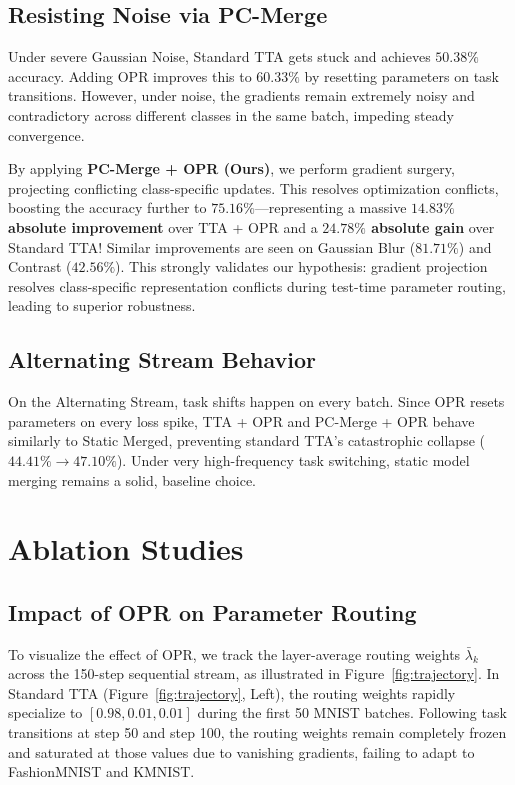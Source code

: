 \documentclass{article}
\theoremstyle{plain}
\theoremstyle{definition}
\theoremstyle{remark}
\begin{document}
\subsection{Resisting Noise via PC-Merge}
Under severe Gaussian Noise, Standard TTA gets stuck and achieves $50.38\%$ accuracy. Adding OPR improves this to $60.33\%$ by resetting parameters on task transitions. However, under noise, the gradients remain extremely noisy and contradictory across different classes in the same batch, impeding steady convergence.

By applying \textbf{PC-Merge + OPR (Ours)}, we perform gradient surgery, projecting conflicting class-specific updates. This resolves optimization conflicts, boosting the accuracy further to $\mathbf{75.16\%}$—representing a massive \textbf{$14.83\%$ absolute improvement} over TTA + OPR and a \textbf{$24.78\%$ absolute gain} over Standard TTA! Similar improvements are seen on Gaussian Blur ($81.71\%$) and Contrast ($42.56\%$). This strongly validates our hypothesis: gradient projection resolves class-specific representation conflicts during test-time parameter routing, leading to superior robustness.

\subsection{Alternating Stream Behavior}
On the Alternating Stream, task shifts happen on every batch. Since OPR resets parameters on every loss spike, TTA + OPR and PC-Merge + OPR behave similarly to Static Merged, preventing standard TTA's catastrophic collapse ($44.41\% \to 47.10\%$). Under very high-frequency task switching, static model merging remains a solid, baseline choice.

\section{Ablation Studies}
\label{sec:ablations}

\subsection{Impact of OPR on Parameter Routing}
To visualize the effect of OPR, we track the layer-average routing weights $\bar{\lambda}_k$ across the 150-step sequential stream, as illustrated in Figure~\ref{fig:trajectory}. In Standard TTA (Figure~\ref{fig:trajectory}, Left), the routing weights rapidly specialize to $[0.98, 0.01, 0.01]$ during the first 50 MNIST batches. Following task transitions at step 50 and step 100, the routing weights remain completely frozen and saturated at those values due to vanishing gradients, failing to adapt to FashionMNIST and KMNIST. 
\end{document}
